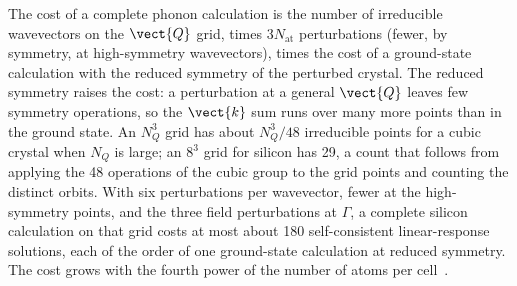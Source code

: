 The cost of a complete phonon calculation is the number of irreducible wavevectors on the $\vect{Q}$ grid, times $3N_{\mathrm{at}}$ perturbations (fewer, by symmetry, at high-symmetry wavevectors), times the cost of a ground-state calculation with the reduced symmetry of the perturbed crystal. The reduced symmetry raises the cost: a perturbation at a general $\vect{Q}$ leaves few symmetry operations, so the $\vect{k}$ sum runs over many more points than in the ground state. An $N_Q^3$ grid has about $N_Q^3/48$ irreducible points for a cubic crystal when $N_Q$ is large; an $8^3$ grid for silicon has 29, a count that follows from applying the 48 operations of the cubic group to the grid points and counting the distinct orbits. With six perturbations per wavevector, fewer at the high-symmetry points, and the three field perturbations at $\Gamma$, a complete silicon calculation on that grid costs at most about 180 self-consistent linear-response solutions, each of the order of one ground-state calculation at reduced symmetry. The cost grows with the fourth power of the number of atoms per cell~\cite[Sect.~IV.B]{baroni2001phonons}.

